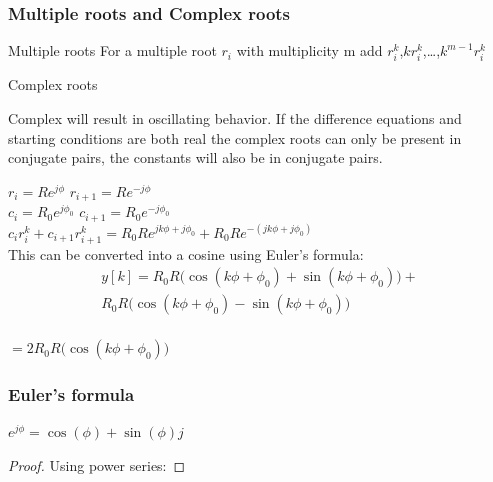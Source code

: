 \begin{frame}
	\frametitle{Multiple roots and Complex roots}
	\begin{block}{Multiple roots}
		For a multiple root $r_i$ with multiplicity m add $r_i^k$,$kr_i^k$,\dots,$k^{m-1}r_i^{k}$
	\end{block}
	\begin{block}{Complex roots}
		\small{
		Complex  will result in oscillating behavior.
		If the difference equations and starting conditions are both real the complex roots can only be present in conjugate pairs, the constants will also be in conjugate pairs.
		\vspace{-1em}
		\begin{center}
				$ r_i = Re^{j\phi}$ 	$r_{i+1} = Re^{-j\phi}$\\
				$c_i = R_0e^{j\phi_0}$	 $c_{i+1} = R_0e^{-j\phi_0}$\\
				$c_ir_i^k+c_{i+1}r_{i+1}^k = R_0Re^{jk\phi+j\phi_0} +  R_0Re^{-(jk\phi+j\phi_0)} $\\
				This can be converted into a cosine using Euler’s formula:
				\vspace{-1em}
				\begin{multline*}
						y[k] = R_0R\big(\cos(k\phi+\phi_0) + \sin(k\phi+\phi_0) \big) +\\ R_0R\big(\cos(k\phi+\phi_0) - \sin(k\phi+\phi_0) \big)  
				\end{multline*}\\
						 $= 2R_0R\big(\cos(k\phi+\phi_0)\big)$			
		\end{center}}
	\end{block}
\end{frame}
\begin{frame}
	\frametitle{Euler’s formula}
	\begin{theorem}
		$e^{j\phi} = \cos(\phi) + \sin(\phi)j$
	\end{theorem}
	\begin{proof}
		Using power series:
		
		
	\end{proof}
\end{frame}
